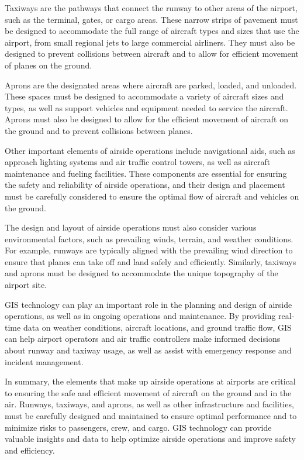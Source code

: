     Taxiways are the pathways that connect the runway to other areas of the airport, such as the terminal, gates, or cargo areas. These narrow strips of pavement must be designed to accommodate the full range of aircraft types and sizes that use the airport, from small regional jets to large commercial airliners. They must also be designed to prevent collisions between aircraft and to allow for efficient movement of planes on the ground.

    Aprons are the designated areas where aircraft are parked, loaded, and unloaded. These spaces must be designed to accommodate a variety of aircraft sizes and types, as well as support vehicles and equipment needed to service the aircraft. Aprons must also be designed to allow for the efficient movement of aircraft on the ground and to prevent collisions between planes.

    Other important elements of airside operations include navigational aids, such as approach lighting systems and air traffic control towers, as well as aircraft maintenance and fueling facilities. These components are essential for ensuring the safety and reliability of airside operations, and their design and placement must be carefully considered to ensure the optimal flow of aircraft and vehicles on the ground.

    The design and layout of airside operations must also consider various environmental factors, such as prevailing winds, terrain, and weather conditions. For example, runways are typically aligned with the prevailing wind direction to ensure that planes can take off and land safely and efficiently. Similarly, taxiways and aprons must be designed to accommodate the unique topography of the airport site.

    GIS technology can play an important role in the planning and design of airside operations, as well as in ongoing operations and maintenance. By providing real-time data on weather conditions, aircraft locations, and ground traffic flow, GIS can help airport operators and air traffic controllers make informed decisions about runway and taxiway usage, as well as assist with emergency response and incident management.

    In summary, the elements that make up airside operations at airports are critical to ensuring the safe and efficient movement of aircraft on the ground and in the air. Runways, taxiways, and aprons, as well as other infrastructure and facilities, must be carefully designed and maintained to ensure optimal performance and to minimize risks to passengers, crew, and cargo. GIS technology can provide valuable insights and data to help optimize airside operations and improve safety and efficiency.

